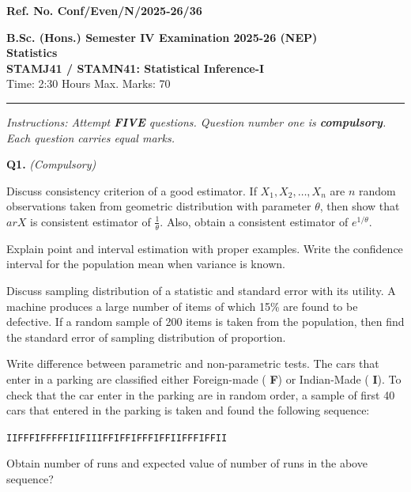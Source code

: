 \documentclass[11pt,a4paper]{article}
\begin{document}
\begin{flushright}
  \small   \textbf{Ref. No. Conf/Even/N/2025-26/36}
\end{flushright}


\begin{center}
  {\large\bfseries B.Sc. (Hons.) Semester IV Examination 2025-26 (NEP)}\\[4pt]
  {\large\bfseries Statistics}\\[4pt]
  {\large\bfseries STAMJ41 / STAMN41: Statistical Inference-I}\\[4pt]
  {\normalsize Time: 2:30 Hours \hfill Max. Marks: 70}
\end{center}

\rule{\linewidth}{0.4pt}\smallskip



\noindent   \textit{Instructions: Attempt   \textbf{FIVE} questions. Question number one is   \textbf{compulsory}. Each question carries equal marks.}
\bigskip




\noindent   \textbf{Q1.}   \textit{(Compulsory)}

\begin{parts}
  \item Discuss consistency criterion of a good estimator. If $X_1, X_2, \dots, X_n$ are $n$ random observations taken from geometric distribution with parameter $ \theta$, then show that $ar{X}$ is consistent estimator of $\frac{1}{ \theta}$. Also, obtain a consistent estimator of $e^{1/ \theta}$.

  \item Explain point and interval estimation with proper examples. Write the confidence interval for the population mean when variance is known.

  \item Discuss sampling distribution of a statistic and standard error with its utility. A machine produces a large number of items of which 15\% are found to be defective. If a random sample of 200 items is taken from the population, then find the standard error of sampling distribution of proportion.

  \item Write difference between parametric and non-parametric tests. The cars that enter in a parking are classified either Foreign-made (   \textbf{F}) or Indian-Made (   \textbf{I}). To check that the car enter in the parking are in random order, a sample of first 40 cars that entered in the parking is taken and found the following sequence:
  
\begin{center}
   \texttt{IIFFFIFFFFFIIFIIIFFIFFIFFFIFFIIFFFIFFII}
  \end{center}
  Obtain number of runs and expected value of number of runs in the above sequence?
\end{parts}
\end{document}
